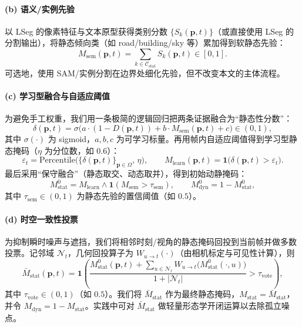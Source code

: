 \documentclass[10pt,conference]{IEEEtran} %
\begin{document}
\paragraph{(b) 语义/实例先验}
以 LSeg 的像素特征与文本原型获得类别分数 $\{S_k(\mathbf p,t)\}$（或直接使用 LSeg 的分割输出），将静态倾向类（如 road/building/sky 等）累加得到软静态先验：
\begin{equation}
M_{\mathrm{sem}}(\mathbf p,t)=\sum_{k\in\mathcal C_{\mathrm{stat}}}S_k(\mathbf p,t)\in[0,1].
\label{eq:demm_sem}
\end{equation}
可选地，使用 SAM/实例分割在边界处细化先验，但不改变本文的主体流程。

\paragraph{(c) 学习型融合与自适应阈值}
为避免手工权重，我们用一条极简的逻辑回归把两条证据融合为“静态性分数”：
\begin{equation}
\delta(\mathbf p,t)=\sigma\!\bigl(a\cdot(1-D(\mathbf p,t))+b\cdot M_{\mathrm{sem}}(\mathbf p,t)+c\bigr)\in(0,1),
\label{eq:demm_delta}
\end{equation}
其中 $\sigma(\cdot)$ 为 sigmoid，$a,b,c$ 为可学习标量。再用帧内自适应阈值得到学习型静态掩码（$\eta$ 为分位数，如 $0.6$）：
\begin{equation}
\varepsilon_t=\mathrm{Percentile}\bigl(\{\delta(\mathbf p,t)\}_{\mathbf p\in\Omega},\,\eta\bigr),\qquad
M_{\mathrm{learn}}(\mathbf p,t)=\mathbf 1\bigl(\delta(\mathbf p,t)>\varepsilon_t\bigr).
\label{eq:demm_thresh}
\end{equation}
最后采用“保守融合”（静态取交、动态取并），得到初始动静掩码：
\begin{equation}
M_{\mathrm{stat}}^{0}=M_{\mathrm{learn}}\wedge \mathbf 1(M_{\mathrm{sem}}>\tau_{\mathrm{sem}}),\qquad
M_{\mathrm{dyn}}^{0}=1-M_{\mathrm{stat}}^{0},
\label{eq:demm_fuse}
\end{equation}
其中 $\tau_{\mathrm{sem}}\in(0,1)$ 为静态先验的置信阈值（如 $0.5$）。

\paragraph{(d) 时空一致性投票}
为抑制瞬时噪声与遮挡，我们将相邻时刻/视角的静态掩码回投到当前帧并做多数投票。记邻域 $\mathcal N_t$，几何回投算子为 $W_{u\rightarrow t}(\cdot)$（由相机标定与可见性计算），则
\begin{equation}
\bar M_{\mathrm{stat}}(\mathbf p,t)=
\mathbf 1\!\left(
\frac{M_{\mathrm{stat}}^{0}(\mathbf p,t)+\sum_{u\in\mathcal N_t}W_{u\rightarrow t}\!\big(M_{\mathrm{stat}}^{0}(\cdot,u)\big)}{\,1+|\mathcal N_t|\,}
>\tau_{\mathrm{vote}}
\right),
\label{eq:demm_vote}
\end{equation}
其中 $\tau_{\mathrm{vote}}\in(0,1)$（如 $0.5$）。我们将 $\bar M_{\mathrm{stat}}$ 作为最终静态掩码，$M_{\mathrm{stat}}=\bar M_{\mathrm{stat}}$，并令 $M_{\mathrm{dyn}}=1-M_{\mathrm{stat}}$。实践中可对 $\bar M_{\mathrm{stat}}$ 做轻量形态学开闭运算以去除孤立噪点。
\end{document}
